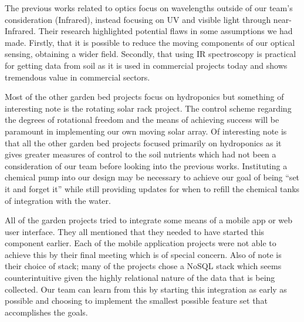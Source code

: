 The previous works related to optics focus on wavelengths outside of our team's consideration (Infrared), instead focusing on UV and visible light through near-Infrared. Their research highlighted potential flaws in some assumptions we had made. Firstly, that it is possible to reduce the moving components of our optical sensing, obtaining a wider field. Secondly, that using IR spectroscopy is practical for getting data from soil as it is used in commercial projects today and shows tremendous value in commercial sectors.

Most of the other garden bed projects focus on hydroponics but something of interesting note is the rotating solar rack project. The control scheme regarding the degrees of rotational freedom and the means of achieving success will be paramount in implementing our own moving solar array. Of interesting note is that all the other garden bed projects focused primarily on hydroponics as it gives greater measures of control to the soil nutrients which had not been a consideration of our team before looking into the previous works. Instituting a chemical pump into our design may be necessary to achieve our goal of being ``set it and forget it'' while still providing updates for when to refill the chemical tanks of integration with the water.

All of the garden projects tried to integrate some means of a mobile app or web user interface. They all mentioned that they needed to have started this component earlier. Each of the mobile application projects were not able to achieve this by their final meeting which is of special concern. Also of note is their choice of stack; many of the projects chose a NoSQL stack which seems counterintuitive given the highly relational nature of the data that is being collected. Our team can learn from this by starting this integration as early as possible and choosing to implement the smallest possible feature set that accomplishes the goals.
